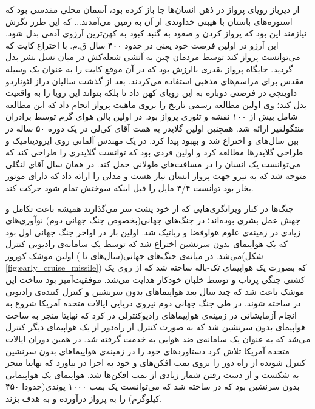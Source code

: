 از دیرباز رویای پرواز در ذهن انسان‌ها جا باز کرده بود، آسمان محلی مقدسی بود که استوره‌های باستان با هیبتی خداوندی از آن به زمین می‌آمدند... که این طرز نگرش نیازمند این بود که پرواز کردن و صعود به گنبد کبود به کهن‌ترین آرزوی آدمی بدل شود. این آرزو در اولین فرصت خود یعنی در حدود ۴۰۰ سال ق.م. با اختراع کایت که می‌توانست پرواز کند توسط مردمان چین به آتشی شعله‌کش در میان نسل بشر بدل گردید. جایگاه پرواز بقدری باارزش بود که در آن موقع کایت را به عنوان یک وسیله مقدس برای مراسم‌های مذهبی استفاده می‌کردند. بعد از گذشت سالیان دراز لئوناردو داوینچی در  فرصتی دوباره به این رویای کهن داد تا بلکه بتواند این رویا را به واقعیت بدل کند؛ وی اولین مطالعه رسمی تاریخ را بروی ماهیت پرواز انجام داد که این مطالعه شامل بیش از ۱۰۰ نقشه و تئوری پرواز بود. در  اولین بالن هوای گرم توسط برادران منتگولفیر ارائه شد. همچنین اولین گلایدر به همت آقای کی‌لی در یک دوره ۵۰ ساله در بین سال‌های  و  اختراع شد و بهبود پیدا کرد. در  یک مهندس آلمانی روی ایرودینامیک و طراحی گلایدرها مطالعه کرد و اولین فردی بود که توانست گلایدری را طراحی کند که می‌توانست یک انسان را در مسافت‌های طولانی حمل کند. در همان سال آقای لنگلی متوجه شد که به نیرو جهت پرواز انسان نیاز هست و مدلی را ارائه داد که دارای موتور بخار بود توانست ۳/۴ مایل را قبل اینکه سوختش تمام شود حرکت کند.

جنگ‌ها در کنار ویرانگری‌هایی که از خود پشت سر می‌گذارند همیشه باعث تکامل و جهش عمل بشری بوده‌اند؛ در جنگ‌های جهانی(بخصوص جنگ جهانی دوم) نوآوری‌های زیادی در زمینه‌ی علوم هواوفضا و رباتیک شد. اولین بار در اواخر جنگ جهانی اول بود که یک هواپیمای بدون سرنشین اختراع شد که توسط یک سامانه‌ی رادیویی کنترل می‌شد. در میانه‌ی جنگ‌های جهانی(سال‌های  تا ) اولین موشک کوروز(شکل \ref{fig:early_cruise_missile}) که بصورت یک هواپیمای تک-باله ساخته شد که از روی یک کشتی جنگی پرتاب و توسط خلبان خودکار هدایت می‌شد. موفقیت‌آمیز بود ساخت این موشک باعث شد که چند سال بعد هواپیماهای بدون سرنشین و کنترل کننده‌ی رادیویی در  ساخته شوند. در طی جنگ جهانی دوم نیروی دریایی ایالات متحده آمریکا شروع به انجام آزمایشاتی در زمینه‌ی هواپیما‌های رادیوکنترلی در  کرد که نهایتا منجر به ساخت هواپیمای بدون سرنشین  شد که به صورت کنترل از راه‌دور از یک هواپیمای دیگر کنترل می‌شد که به عنوان یک سامانه‌ی ضد هوایی به خدمت گرفته شد. در همین دوران ایالات متحده آمریکا تلاش کرد دستاوردهای خود را در زمینه‌ی هواپیماهای بدون سرنشین کنترل شونده از راه دور را بروی بمب افکن‌های  و  خود به اجرا در بیاورد که نهایتا منجر به شکست و از دست رفتن شمار زیادی از بمب افکن‌ها شد. هواپیمای  یک هواپیمایی بدون سرنشین بود که در  ساخته شد که می‌توانست یک بمب ۱۰۰۰ پوندی(حدودا ۴۵۰ کیلوگرم) را به پرواز درآورده و به هدف بزند.


